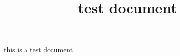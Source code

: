\documentclass{report}
\begin{document}
\title{test document}
\maketitle

this is a test document
\end{document}
